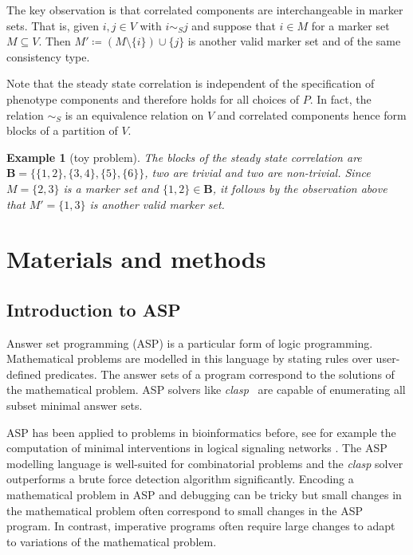 \documentclass[11pt]{article}
\newtheorem{example}{Example}[section]
\begin{document}
    The key observation is that correlated components are interchangeable in marker sets.
    That is, given $i,j \in V$ with $i \sim_S j$ and suppose that $i \in M$ for a marker set $M \subseteq V$.
    Then $M' \coloneqq (M \setminus \{i\}) \cup \{j\}$ is another valid marker set and of the same consistency type.

    Note that the steady state correlation is independent of the specification of phenotype components and therefore holds for all choices of $P$.
    In fact, the relation $\sim_S$ is an equivalence relation on $V$ and correlated components hence form blocks of a partition of $V$.

    \begin{example}[toy problem]
        The blocks of the steady state correlation are $\mathbf B=\{\{1,2\}, \{3,4\}, \{5\}, \{6\}\}$, two are trivial and two are non-trivial.
        Since $M=\{2,3\}$ is a marker set and $\{1,2\} \in \mathbf B$, it follows by the observation above that $M'=\{1,3\}$ is another valid marker set.
    \end{example}

    \section{Materials and methods}\label{sec:materials-and-methods}
    \subsection{Introduction to ASP}
    Answer set programming (ASP) is a particular form of logic programming.
    Mathematical problems are modelled in this language by stating rules over user-defined predicates.
    The answer sets of a program correspond to the solutions of the mathematical problem.
    ASP solvers like \emph{clasp}~\cite{gebser2007clasp} are capable of enumerating all subset minimal answer sets.

    ASP has been applied to problems in bioinformatics before, see for example the computation of minimal interventions in logical signaling networks \cite{kaminski_schaub_siegel_videla_2013}.
    The ASP modelling language is well-suited for combinatorial problems and the \emph{clasp} solver outperforms a brute force detection algorithm significantly.
    Encoding a mathematical problem in ASP and debugging can be tricky but small changes in the mathematical problem often correspond to small changes in the ASP program.
    In contrast, imperative programs often require large changes to adapt to variations of the mathematical problem.
\end{document}
